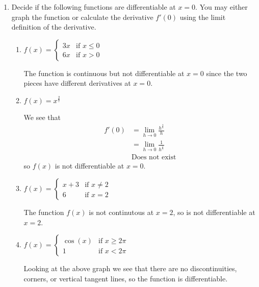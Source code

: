 \documentclass[11pt]{article}
\begin{document}
\drawtitle
\begin{enumerate}

\item Decide if the following functions are differentiable at $x=0$.
  You may either graph the function or calculate the derivative
  $f'(0)$ using the limit definition of the derivative.
  \begin{enumerate}
  \item $\displaystyle f(x) = \begin{cases} 3x &\mbox{if } x\leq 0\\
      6x &\mbox{if } x > 0 \end{cases}$
    \vfill
    {\color{blue}

      The function is continuous but not differentiable at $x=0$ since the two
      pieces have different derivatives at $x=0$.

    }
    \vfill
  \item $f(x) = x^{\frac{2}{7}}$
    \vfill
    {\color{blue}
      
      We see that
      \begin{align*}
        f'(0) &= \lim_{h\to 0} \frac{h^{\frac{2}{7}}}{h}\\
        &= \lim_{h\to 0} \frac{1}{h^{\frac{5}{7}}}\\
        & \text{Does not exist}
      \end{align*}
      so $f(x)$ is not differentiable at $x=0$.
    }
    \vfill
  \item $\displaystyle f(x) = \begin{cases}
      x+3 &\mbox{if } x\neq 2\\
      6 &\mbox{if } x = 2 \end{cases}$
    \vfill
    {\color{blue}

      The function $f(x)$ is not continutous at $x=2$, so is not
      differentiable at $x=2$.

    }
    \vfill
  \item $\displaystyle f(x) = \begin{cases}
      \cos(x) &\mbox{if } x\geq 2\pi\\
      1 &\mbox{if } x < 2\pi \end{cases}$
    \vfill
    {\color{blue}
      
      \begin{center}
      \end{center}
      Looking at the above graph we see that there are no
      discontinuities, corners, or vertical tangent lines, so the
      function is differentiable.
      
}
\end{enumerate}
\end{enumerate}
\end{document}

